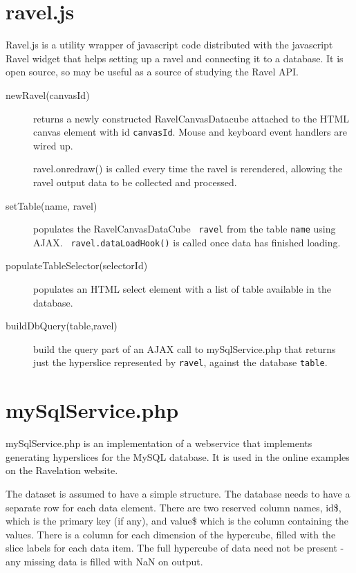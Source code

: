 \documentclass{article}
\begin{document}
\section{ravel.js}

Ravel.js is a utility wrapper of javascript code distributed with the
javascript Ravel widget that helps setting up a ravel and connecting
it to a database. It is open source, so may be useful as a source of
studying the Ravel API.

\begin{description}
  \item[newRavel(canvasId)] returns a newly constructed
    RavelCanvasDatacube attached to the HTML canvas element with id
    {\tt canvasId}. Mouse and keyboard event handlers are wired up.

    ravel.onredraw() is called every time the ravel is rerendered,
    allowing the ravel output data to be collected and processed.
    
  \item[setTable(name, ravel)] populates the RavelCanvasDataCube {\tt
    ravel} from the table {\tt name} using AJAX. {\tt
    ravel.dataLoadHook()} is called once data has finished loading.
  \item[populateTableSelector(selectorId)] populates an HTML select
    element with a list of table available in the database.
    \item[buildDbQuery(table,ravel)] build the query part of an AJAX call
      to mySqlService.php that returns just the hyperslice represented
      by {\tt ravel}, against the database {\tt table}. 
\end{description}

\section{mySqlService.php}

mySqlService.php is an implementation of a webservice that implements
generating hyperslices for the MySQL database. It is used in the
online examples on the Ravelation website.

The dataset is assumed to have a simple structure. The database needs
to have a separate row for each data element. There are two reserved
column names, id\$, which is the primary key (if any), and value\$ which
is the column containing the values. There is a column for each
dimension of the hypercube, filled with the slice labels for each data
item. The full hypercube of data need not be present - any missing
data is filled with NaN on output.
\end{document}
